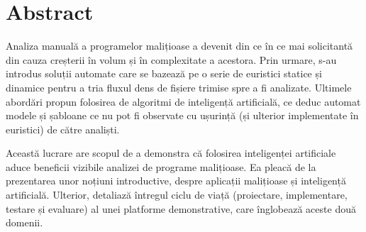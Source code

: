 \chapter*{Abstract}

\thispagestyle{front}

Analiza manuală a programelor malițioase a devenit din ce în ce mai solicitantă din cauza creșterii în volum și în complexitate a acestora. Prin urmare, s-au introdus soluții automate care se bazează pe o serie de euristici statice și dinamice pentru a tria fluxul dens de fișiere trimise spre a fi analizate. Ultimele abordări propun folosirea de algoritmi de inteligență artificială, ce deduc automat mo\-dele și șabloane ce nu pot fi observate cu ușurință (și ulterior implementate în euristici) de către analiști.

Această lucrare are scopul de a demonstra că folosirea inteligenței artificiale aduce beneficii vizibile analizei de programe malițioase. Ea pleacă de la prezentarea unor noțiuni introductive, despre aplicații malițioase și inteligență artificială. Ulterior, detaliază întregul ciclu de viață (proiectare, implementare, testare și evaluare) al unei platforme demonstrative, care înglobează aceste două domenii.

\newpage \